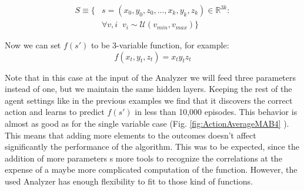 \documentclass[11pt,a4paper,twoside]{report}
\newcommand{\+}{\textnormal{+} }
\theoremstyle{definition}
\numberwithin{equation}{chapter}
\begin{document}
    \begin{align}
      S\equiv\{&s=(x_0,y_0,z_0,...,x_k,y_k,z_k) \in \mathbb{R}^{3k}: \\
      & \forall v,i \; \; v_i \sim \mathcal{U}(v_{min},v_{max})
      \}
    \end{align}

    Now we can set $f(s')$ to be 3-variable function, for example:
    \begin{equation}
      f(x_t,y_t,z_t)=x_ty_tz_t
    \end{equation}

    Note that in this case at the input of the Analyzer we will feed three
    parameters instead of one, but we maintain the same hidden layers. Keeping
    the rest of the agent settings like in the previous examples we find that
    it discovers the correct action and learns to predict $f(s')$ in less than 10,000
    episodes. This behavior is almost as good as for the single variable case
    (Fig. \ref{fig:ActionAverageMAB4} ).
    This means that adding more elements to the outcomes doesn't affect
    significantly the performance of the algorithm. This was to be expected,
    since the addition of more parameters s more tools to recognize the
    correlations at the expense of a maybe more complicated computation of the
    function. However, the used Analyzer has enough flexibility to fit to those
    kind of functions.
\end{document}
